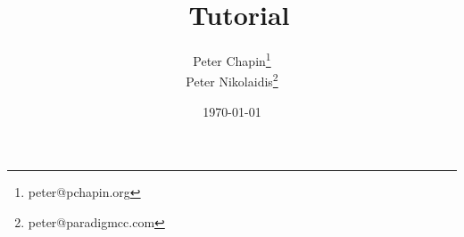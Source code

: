 \documentclass{report}
\begin{document}
\title{\CLAC\ Tutorial}
\author{Peter Chapin\thanks{peter@pchapin.org}\\
        Peter Nikolaidis\thanks{peter@paradigmcc.com}}
\date{\today}
\maketitle

\tableofcontents
\newpage
{}





\end{document}
